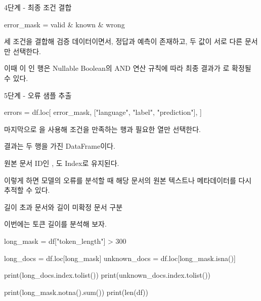 \begin{dhknote}
\begin{dhksmry}[centered]
4단계 - 최종 조건 결합
\end{dhksmry}
\end{dhknote}

\begin{dhkcode}
error_mask = valid & known & wrong
\end{dhkcode}

세 조건을 결합해 검증 데이터이면서, 정답과 예측이 존재하고, 두 값이 서로 다른 문서만 선택한다.

이때 이 인 행은 Nullable Boolean의 AND 연산 규칙에 따라 최종 결과가 로 확정될 수 있다.

\begin{dhknote}
\begin{dhksmry}[centered]
5단계 - 오류 샘플 추출
\end{dhksmry}
\end{dhknote}

\begin{dhkcode}
errors = df.loc[
    error_mask,
    ["language", "label", "prediction"],
]
\end{dhkcode}

마지막으로 을 사용해 조건을 만족하는 행과 필요한 열만 선택한다.

결과는 두 행을 가진 DataFrame이다.

원본 문서 ID인 , 도 Index로 유지된다.

이렇게 하면 모델의 오류를 분석할 때 해당 문서의 원본 텍스트나 메타데이터를 다시 추적할 수 있다.

\begin{dhknote}
\begin{dhksmry}[centered]
길이 초과 문서와 길이 미확정 문서 구분
\end{dhksmry}
\end{dhknote}

이번에는 토큰 길이를 분석해 보자.

\begin{dhkcode}
long_mask = df["token_length"] > 300

long_docs = df.loc[long_mask]
unknown_docs = df.loc[long_mask.isna()]

print(long_docs.index.tolist())
print(unknown_docs.index.tolist())

print(long_mask.notna().sum())
print(len(df))
\end{dhkcode}

